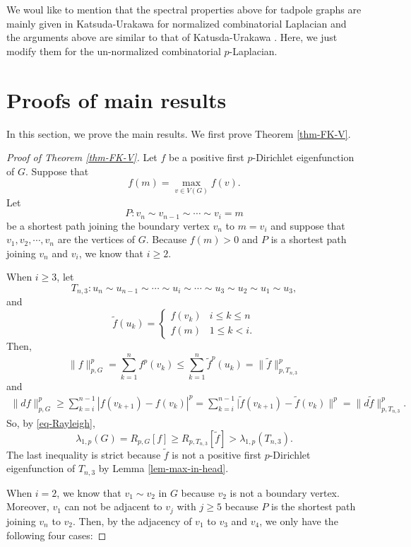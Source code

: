 \documentclass[12pt]{amsart}
\def\wt{\widetilde}
\theoremstyle{definition}
\theoremstyle{remark}
\numberwithin{equation}{section}
\begin{document}
We woul like to mention that the spectral properties above for tadpole graphs are mainly given in  Katsuda-Urakawa \cite{KU} for normalized combinatorial Laplacian and the arguments above are similar to that of Katusda-Urakawa \cite{KU}. Here, we just modify them for the un-normalized combinatorial $p$-Laplacian.


\section{Proofs of main results}
In this section, we prove the main results. We first prove Theorem \ref{thm-FK-V}.
\begin{proof}[Proof of Theorem \ref{thm-FK-V}]
Let $f$ be a positive first $p$-Dirichlet eigenfunction of $G$. Suppose that
$$f(m)=\max_{v\in V(G)}f(v).$$
Let
$$P:v_n\sim v_{n-1}\sim \cdots\sim v_i=m$$
be a shortest path joining the boundary vertex $v_n$ to $m=v_i$ and suppose that
$v_1,v_2,\cdots,v_n$ are the vertices of $G$. Because $f(m)>0$ and $P$ is a shortest path joining $v_n$ and $v_i$, we know that $i\geq 2$.

When $i\geq 3$, let
$$T_{n,3}:u_n\sim u_{n-1}\sim \cdots \sim u_i\sim\cdots \sim u_3\sim u_2\sim u_1\sim u_3,$$
and
$$\wt f(u_k)=\left\{\begin{array}{ll}f(v_k)&i\leq k\leq n\\
f(m)&1\leq k<i.
\end{array}\right.$$
Then,
\begin{equation*}
\|f\|_{p,G}^{p}=\sum_{k=1}^nf^p(v_k)\leq \sum_{k=1}^n\wt f^p(u_k)=\|\wt f\|_{p,T_{n,3}}^p
\end{equation*}
and
\begin{equation*}
\begin{split}
\|df\|_{p,G}^p\geq \sum_{k=i}^{n-1} |f(v_{k+1})-f(v_{k})|^p=\sum_{k=i}^{n-1} |\wt f(v_{k+1})-\wt f(v_{k})\|^p=\|d\wt f\|_{p,T_{n,3}}^p.
\end{split}
\end{equation*}
So, by \eqref{eq-Rayleigh},
$$\lambda_{1,p}(G)=R_{p,G}[f]\geq R_{p,T_{n,3}}[\wt f]>\lambda_{1,p}(T_{n,3}).$$
The last inequality is strict because $\wt f$ is not a positive first $p$-Dirichlet eigenfunction of $T_{n,3}$ by Lemma \ref{lem-max-in-head}.

When $i=2$, we know that $v_1\sim v_2$ in $G$ because $v_2$ is not a boundary vertex. Moreover, $v_1$ can not be adjacent to $v_j$ with $j\geq 5$ because $P$ is the shortest path joining $v_n$ to $v_2$. Then, by the adjacency of $v_1$ to $v_3$ and $v_4$, we  only have the following four cases:


\end{proof}
\end{document}
